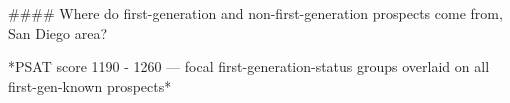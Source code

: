 #### Where do first-generation and non-first-generation prospects come from, San Diego area?

*PSAT score 1190 - 1260 — focal first-generation-status groups overlaid on all first-gen-known prospects*
